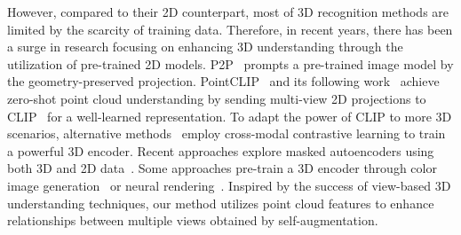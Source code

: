 However, compared to their 2D counterpart, most of 3D recognition methods are limited by the scarcity of training data. Therefore, in recent years, there has been a surge in research focusing on enhancing 3D understanding through the utilization of pre-trained 2D models.
P2P~\citep{p2p} prompts a pre-trained image model by the geometry-preserved projection.
PointCLIP~\citep{zhang2022pointclip} and its following work~\citep{PointCLIPV2} achieve zero-shot point cloud understanding by sending multi-view 2D projections to CLIP~\citep{radford2021learning} for a well-learned representation. To adapt the power of CLIP to more 3D scenarios, alternative methods~\citep{CLIP2,CLIP2point,clip2scene} employ cross-modal contrastive learning to train a powerful 3D encoder.
Recent approaches explore masked autoencoders using both 3D and 2D data~\citep{jointMAE, I2PMAE}. Some approaches pre-train a 3D encoder through color image generation~\citep{takeaphoto} or neural rendering~\citep{ponder}.
Inspired by the success of view-based 3D understanding techniques, our method utilizes point cloud features to enhance relationships between multiple views obtained by self-augmentation.


